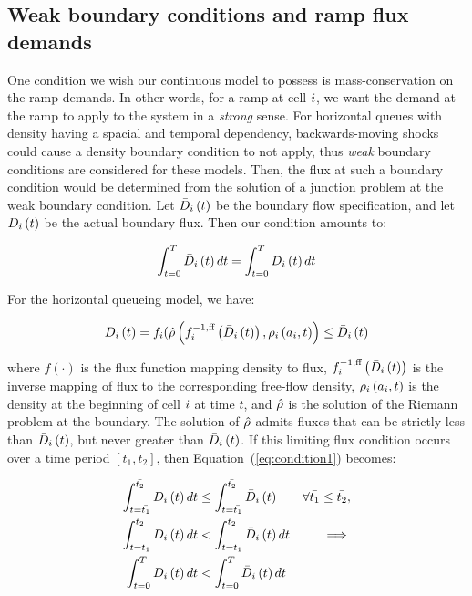 \label{sec:contBufferModel}
\subsection{Weak boundary conditions and ramp flux demands}

One condition we wish our continuous model to possess is mass-conservation
on the ramp demands. In other words, for a ramp at cell $i$,
we want the demand at the ramp to apply to the system in a \emph{strong}
sense. For horizontal queues with density having a spacial and temporal
dependency, backwards-moving shocks could cause a density boundary
condition to not apply, thus \emph{weak} boundary conditions are considered
for these models. Then, the flux at such a boundary condition would
be determined from the solution of a junction problem at the weak boundary
condition. Let $\bar{D}_{i}\left(t\right)$ be the boundary flow specification,
and let $D_{i}\left(t\right)$ be the actual boundary flux. Then
our condition amounts to:

\begin{equation}
\int_{t=0}^{T}\bar{D}_{i}\left(t\right)dt=\int_{t=0}^{T}D_{i}\left(t\right)dt\label{eq:condition1}
\end{equation}


For the horizontal queueing model, we have:

\[
D_{i}\left(t\right)=f_{i}(\hat{\rho}\left(f_{i}^{-1,\text{ff}}\left(\bar{D}_{i}\left(t\right)\right),\rho_{i}\left(a_{i},t\right)\right)\le\bar{D}_{i}\left(t\right)
\]


where $f\left(\cdot\right)$ is the flux function mapping density
to flux, $f_{i}^{-1,\text{ff}}\left(\bar{D}_{i}\left(t\right)\right)$
is the inverse mapping of flux to the corresponding free-flow density,
$\rho_{i}\left(a_{i},t\right)$ is the density at the
beginning of cell $i$ at time $t$, and $\hat{\rho}$
is the solution of the Riemann problem at the boundary. The solution
of $\hat{\rho}$ admits fluxes that can be strictly less
than $\bar{D}_{i}\left(t\right)$, but never greater than $\bar{D}_{i}\left(t\right)$.
If this limiting flux condition occurs over a time period $\left[t_{1},t_{2}\right]$,
then Equation~(\ref{eq:condition1}) becomes:

\begin{eqnarray}
\int_{t=\bar{t_{1}}}^{\bar{t_{2}}}D_{i}\left(t\right)dt & \le\int_{t=\bar{t_{1}}}^{\bar{t_{2}}}\bar{D}_{i}\left(t\right) & \forall\mbox{\ensuremath{\bar{t_{1}}\le\bar{t_{2}}}},\\
\int_{t=t_{1}}^{t_{2}}D_{i}\left(t\right)dt & <\int_{t=t_{1}}^{t_{2}}\bar{D}_{i}\left(t\right)dt & \implies\\
\int_{t=0}^{T}D_{i}\left(t\right)dt & <\int_{t=0}^{T}\bar{D}_{i}\left(t\right)dt
\end{eqnarray}



